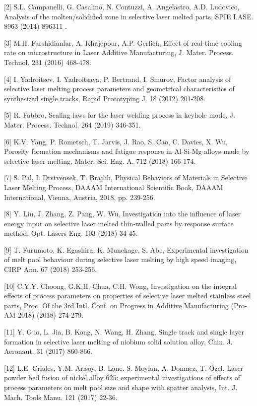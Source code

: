 \documentclass[10pt]{article}
\begin{document}
[2] S.L. Campanelli, G. Casalino, N. Contuzzi, A. Angelastro, A.D. Ludovico, Analysis of the molten/solidified zone in selective laser melted parts, SPIE LASE. 8963 (2014) 896311 .

[3] M.H. Farshidianfar, A. Khajepour, A.P. Gerlich, Effect of real-time cooling rate on microstructure in Laser Additive Manufacturing, J. Mater. Process. Technol. 231 (2016) 468-478.

[4] I. Yadroitsev, I. Yadroitsava, P. Bertrand, I. Smurov, Factor analysis of selective laser melting process parameters and geometrical characteristics of synthesized single tracks, Rapid Prototyping J. 18 (2012) 201-208.

[5] R. Fabbro, Scaling laws for the laser welding process in keyhole mode, J. Mater. Process. Technol. 264 (2019) 346-351.

[6] K.V. Yang, P. Rometsch, T. Jarvis, J. Rao, S. Cao, C. Davies, X. Wu, Porosity formation mechanisms and fatigue response in Al-Si-Mg alloys made by selective laser melting, Mater. Sci. Eng. A. 712 (2018) 166-174.

[7] S. Pal, I. Drstvensek, T. Brajlih, Physical Behaviors of Materials in Selective Laser Melting Process, DAAAM International Scientific Book, DAAAM International, Vienna, Austria, 2018, pp. 239-256.

[8] Y. Liu, J. Zhang, Z. Pang, W. Wu, Investigation into the influence of laser energy input on selective laser melted thin-walled parts by response surface method, Opt. Lasers Eng. 103 (2018) 34-45.

[9] T. Furumoto, K. Egashira, K. Munekage, S. Abe, Experimental investigation of melt pool behaviour during selective laser melting by high speed imaging, CIRP Ann. 67 (2018) 253-256.

[10] C.Y.Y. Choong, G.K.H. Chua, C.H. Wong, Investigation on the integral effects of process parameters on properties of selective laser melted stainless steel parts, Proc. Of the 3rd Intl. Conf. on Progress in Additive Manufacturing (Pro-AM 2018) (2018) 274-279.

[11] Y. Guo, L. Jia, B. Kong, N. Wang, H. Zhang, Single track and single layer formation in selective laser melting of niobium solid solution alloy, Chin. J. Aeronaut. 31 (2017) 860-866.

[12] L.E. Criales, Y.M. Arısoy, B. Lane, S. Moylan, A. Donmez, T. Özel, Laser powder bed fusion of nickel alloy 625: experimental investigations of effects of process parameters on melt pool size and shape with spatter analysis, Int. J. Mach. Tools Manu. 121 (2017) 22-36.
\end{document}
